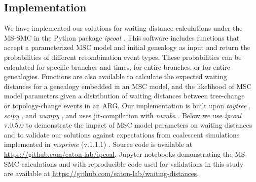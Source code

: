 \documentclass[11pt]{article}
\begin{document}
\subsection{Implementation}
We have implemented our solutions for waiting distance calculations
under the MS-SMC in the Python package \emph{ipcoal} \citep{mckenzie_ipcoal_2020}.
This software includes functions that accept a parameterized MSC model and 
initial genealogy as input and return the probabilities of different 
recombination event types. These probabilities can be calculated for specific 
branches and times, for entire branches, or for entire genealogies. 
Functions are also available to calculate the expected waiting distances 
for a genealogy embedded in an MSC model,
and the likelihood of MSC model parameters given a distribution 
of waiting distances between tree-change or topology-change events in an ARG.
Our implementation is built upon \emph{toytree} \citep{eaton_toytree_2020}, 
\emph{scipy} \citep{2020SciPy-NMeth}, and 
\emph{numpy} \citep{harris2020array}, and 
uses jit-compilation with \emph{numba} 
\citep{lam2015numba}.
Below we use \emph{ipcoal} v.0.5.0 to demonstrate the impact of 
MSC model parameters on waiting distances and to validate our solutions against 
expectations from coalescent simulations implemented in 
\emph{msprime} (v.1.1.1) \citep{baumdicker_efficient_2022}.
Source code is available at \url{https://github.com/eaton-lab/ipcoal}.
Jupyter notebooks demonstrating the MS-SMC calculations and with 
reproducible code used for validations in this study are available
at \url{https://github.com/eaton-lab/waiting-distances}.
\end{document}
